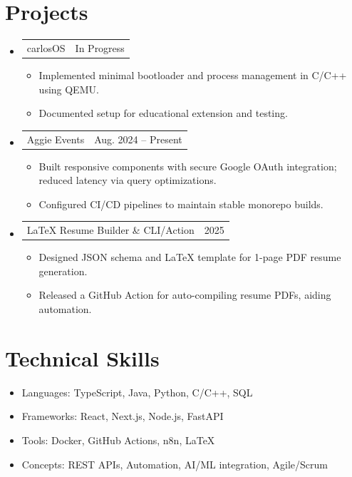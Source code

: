 \documentclass[letterpaper,11pt]{article}
\makeatletter
\newcommand{\resumeItem}[1]{
  \item\small{{#1 \vspace{-2pt}}}
}
\newcommand{\resumeProjectHeading}[2]{
  \item
  \begin{tabular*}{0.97\textwidth}{l@{\extracolsep{\fill}}r}
    \small#1 & #2 \\
  \end{tabular*}\vspace{-7pt}
}
\newcommand{\resumeSubHeadingListStart}{\begin{itemize}[leftmargin=0.15in, label={}]}
\newcommand{\resumeSubHeadingListEnd}{\end{itemize}}
\newcommand{\resumeItemListStart}{\begin{itemize}}
\newcommand{\resumeItemListEnd}{\end{itemize}\vspace{-5pt}}
\makeatother
\begin{document}
\section{Projects}
\resumeSubHeadingListStart
\resumeProjectHeading
{carlosOS}{In Progress}
\resumeItemListStart
\resumeItem{Implemented minimal bootloader and process management in C/C++ using QEMU.}
\resumeItem{Documented setup for educational extension and testing.}
\resumeItemListEnd
\resumeProjectHeading
{Aggie Events}{Aug. 2024 -- Present}
\resumeItemListStart
\resumeItem{Built responsive components with secure Google OAuth integration; reduced latency via query optimizations.}
\resumeItem{Configured CI/CD pipelines to maintain stable monorepo builds.}
\resumeItemListEnd
\resumeProjectHeading
{LaTeX Resume Builder \& CLI/Action}{2025}
\resumeItemListStart
\resumeItem{Designed JSON schema and LaTeX template for 1-page PDF resume generation.}
\resumeItem{Released a GitHub Action for auto-compiling resume PDFs, aiding automation.}
\resumeItemListEnd
\resumeSubHeadingListEnd

\section{Technical Skills}
\begin{itemize}[leftmargin=0.15in, label={}]
  \item Languages: TypeScript, Java, Python, C/C++, SQL
  \item Frameworks: React, Next.js, Node.js, FastAPI
  \item Tools: Docker, GitHub Actions, n8n, LaTeX
  \item Concepts: REST APIs, Automation, AI/ML integration, Agile/Scrum
\end{itemize}
\end{document}
